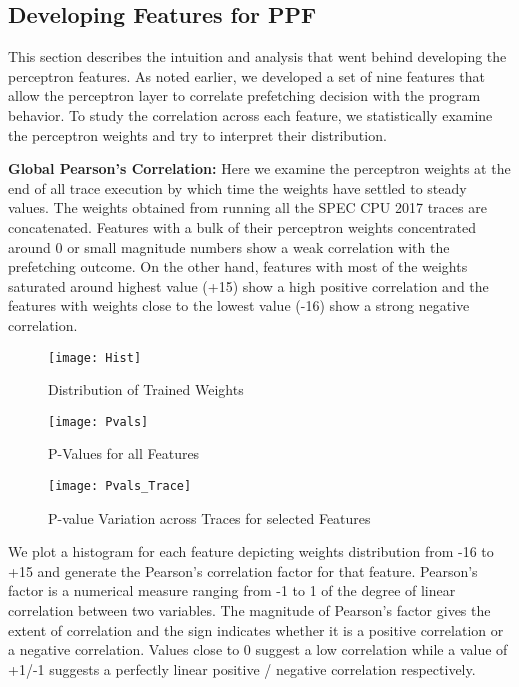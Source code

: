 \subsection{Developing Features for PPF}
\label{Method-Features}
This section describes the intuition and analysis that went behind
developing the perceptron features.  As noted earlier, we developed a
set of nine features that allow the perceptron layer to correlate
prefetching decision with the program behavior.  To study the
correlation across each feature, we statistically examine the
perceptron weights and try to interpret their distribution.

\noindent \textbf{Global Pearson's Correlation:} Here we examine the
perceptron weights at the end of all trace execution by which time the
weights have settled to steady values. The weights obtained from
running all the SPEC CPU 2017 traces are concatenated.  Features with
a bulk of their perceptron weights concentrated around 0 or small
magnitude numbers show a weak correlation with the prefetching
outcome.  On the other hand, features with most of the weights
saturated around highest value (+15) show a high positive correlation
and the features with weights close to the lowest value (-16) show a
strong negative correlation.

\begin{figure}[h]
  \begin{center}
    \texttt{[image: Hist]}
    \caption{Distribution of Trained Weights}
    \label{Fig:Hist}
  \end{center}
\end{figure}

\begin{figure}[h]
  \begin{center}
    \texttt{[image: Pvals]}
    \caption{P-Values for all Features}
    \label{Fig:Pvals}
  \end{center}
\end{figure}


\begin{figure}[h]
  \begin{center}
    \texttt{[image: Pvals\_Trace]}
    \caption{P-value Variation across Traces for selected Features}
    \label{Fig:Pvals_Trace}
  \end{center}
\end{figure}

We plot a histogram for each feature depicting weights distribution
from -16 to +15 and generate the Pearson's correlation factor for that
feature.  Pearson's factor is a numerical measure ranging from -1 to 1
of the degree of linear correlation between two variables. The
magnitude of Pearson's factor gives the extent of correlation and the
sign indicates whether it is a positive correlation or a negative
correlation. Values close to 0 suggest a low correlation while a value
of +1/-1 suggests a perfectly linear positive / negative correlation
respectively.

